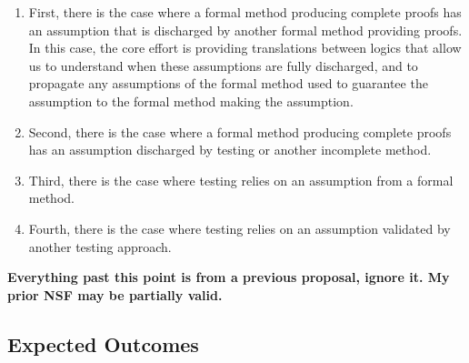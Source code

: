 \begin{enumerate}
\item First, there is the case where a formal method producing
  complete proofs has an assumption that is discharged by another
  formal method providing proofs.  In this case, the core effort is
  providing translations between logics that allow us to understand
  when these assumptions are fully discharged, and to propagate any
  assumptions of the formal method used to guarantee the assumption to the
  formal method making the assumption.

\item Second, there is the case where a formal method producing
  complete proofs has an assumption discharged by testing or another
  incomplete method.

\item Third, there is the case where testing relies on an assumption
  from a formal method.

\item Fourth, there is the case where testing relies on an assumption
  validated by another testing approach.
\end{enumerate}

{\bf Everything past this point is from a previous proposal, ignore
  it.  My prior NSF may be partially valid.}

\subsection{Expected Outcomes}

